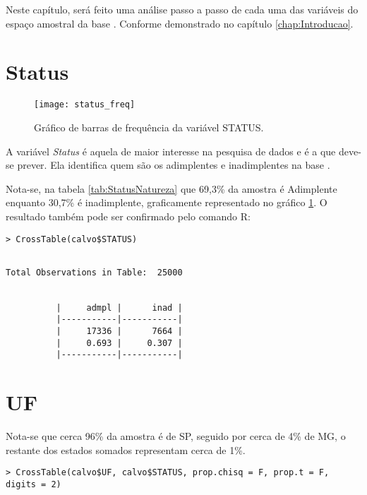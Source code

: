 Neste capítulo, será feito uma análise passo a passo de cada uma das
variáveis do espaço amostral da base \nomeDaBase{}. Conforme demonstrado
no capítulo \ref{chap:Introducao}.


\section{Status}

\begin{figure}
\begin{centering}
\texttt{[image: status\_freq]}
\par\end{centering}

\caption{\label{fig:FreqStatus}Gráfico de barras de frequência da variável
STATUS.}
\end{figure}
A variável \emph{Status }é aquela de maior interesse na pesquisa de
dados e é a que deve-se prever. Ela identifica quem são os adimplentes
e inadimplentes na base \nomeDaBase{}.

Nota-se, na tabela \ref{tab:StatusNatureza} que 69,3\% da amostra
é Adimplente enquanto 30,7\% é inadimplente, graficamente representado
no gráfico \ref{fig:FreqStatus}. O resultado também pode ser confirmado
pelo comando R:

\begin{verbatim}
> CrossTable(calvo$STATUS)
\end{verbatim}

\begin{lstlisting}
 
Total Observations in Table:  25000 
 
 
          |     admpl |      inad | 
          |-----------|-----------|
          |     17336 |      7664 | 
          |     0.693 |     0.307 | 
          |-----------|-----------|
\end{lstlisting}



\section{UF}

Nota-se que cerca 96\% da amostra é de SP, seguido por cerca de 4\%
de MG, o restante dos estados somados representam cerca de 1\%.

\begin{verbatim}
> CrossTable(calvo$UF, calvo$STATUS, prop.chisq = F, prop.t = F, digits = 2)
\end{verbatim}

